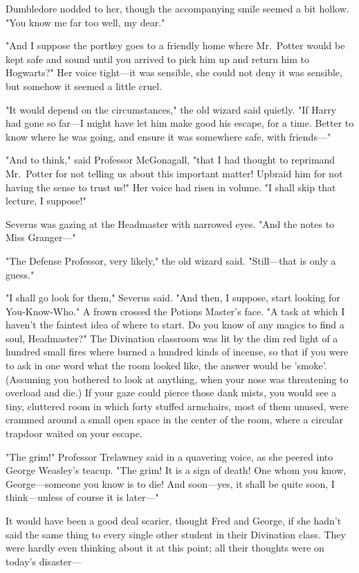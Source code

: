 Dumbledore nodded to her, though the accompanying smile seemed a bit hollow. "You know me far too well, my dear."

"And I suppose the portkey goes to a friendly home where Mr.~Potter would be kept safe and sound until you arrived to pick him up and return him to Hogwarts?" Her voice tight---it was sensible, she could not deny it was sensible, but somehow it seemed a little cruel.

"It would depend on the circumstances," the old wizard said quietly. "If Harry had gone so far---I might have let him make good his escape, for a time. Better to know where he was going, and ensure it was somewhere safe, with friends---"

"And to think," said Professor McGonagall, "that I had thought to reprimand Mr.~Potter for not telling us about this important matter! Upbraid him for not having the sense to trust us!" Her voice had risen in volume. "I shall skip that lecture, I suppose!"

Severus was gazing at the Headmaster with narrowed eyes. "And the notes to Miss Granger---"

"The Defense Professor, very likely," the old wizard said. "Still---that is only a guess."

"I shall go look for them," Severus said. "And then, I suppose, start looking for You-Know-Who." A frown crossed the Potions Master's face. "A task at which I haven't the faintest idea of where to start. Do you know of any magics to find a soul, Headmaster?"
\sbreak
The Divination classroom was lit by the dim red light of a hundred small fires where burned a hundred kinds of incense, so that if you were to ask in one word what the room looked like, the answer would be 'smoke'. (Assuming you bothered to look at anything, when your nose was threatening to overload and die.) If your gaze could pierce those dank mists, you would see a tiny, cluttered room in which forty stuffed armchairs, most of them unused, were crammed around a small open space in the center of the room, where a circular trapdoor waited on your escape.

"The grim!" Professor Trelawney said in a quavering voice, as she peered into George Weasley's teacup. "The grim! It is a sign of death! One whom you know, George---someone you know is to die! And soon---yes, it shall be quite soon, I think---unless of course it is later---"

It would have been a good deal scarier, thought Fred and George, if she hadn't said the same thing to every single other student in their Divination class. They were hardly even thinking about it at this point; all their thoughts were on today's disaster---

